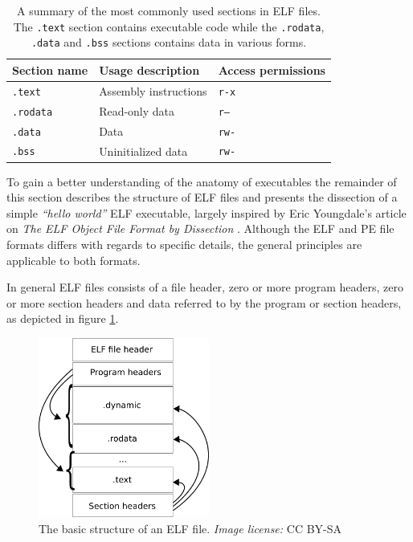 \documentclass[12pt, a4paper]{article}
\begin{document}
\begin{table}[htbp]
	\begin{center}
		\begin{tabular}{|l|l|l|}
			\hline
			Section name & Usage description & Access permissions \\
			\hline
			\texttt{.text} & Assembly instructions & \texttt{r-x} \\
			\texttt{.rodata} & Read-only data & \texttt{r--} \\
			\texttt{.data} & Data & \texttt{rw-} \\
			\texttt{.bss} & Uninitialized data & \texttt{rw-} \\
			\hline
		\end{tabular}
	\end{center}
	\caption{A summary of the most commonly used sections in ELF files. The \texttt{.text} section contains executable code while the \texttt{.rodata}, \texttt{.data} and \texttt{.bss} sections contains data in various forms.}
	\label{elf_sections}
\end{table}

To gain a better understanding of the anatomy of executables the remainder of this section describes the structure of ELF files and presents the dissection of a simple \textit{``hello world''} ELF executable, largely inspired by Eric Youngdale's article on \textit{The ELF Object File Format by Dissection} \cite{elf_dissection}. Although the ELF and PE file formats differs with regards to specific details, the general principles are applicable to both formats.

In general ELF files consists of a file header, zero or more program headers, zero or more section headers and data referred to by the program or section headers, as depicted in figure \ref{elf_structure}.

\begin{figure}[htbp]
	\begin{center}
		\includegraphics[width=0.5\textwidth]{inc/elf_structure.png}
		\caption{The basic structure of an ELF file. \textit{Image license:} CC BY-SA \cite{elf_structure_orig}}
		\label{elf_structure}
	\end{center}
\end{figure}
\end{document}
